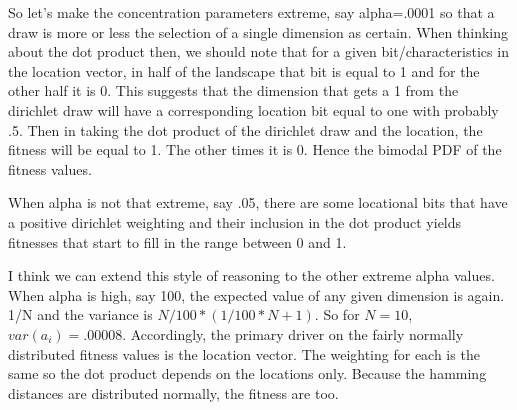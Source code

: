 \documentclass[12pt]{article}
\begin{document}
So let's make the concentration parameters extreme, say alpha=.0001 so that a draw is more or less the selection of a single dimension as certain. When thinking about the dot product then, we should note that for a given bit/characteristics in the location vector, in half of the landscape that bit is equal to 1 and for the other half it is 0. This suggests that the dimension that gets a 1 from the dirichlet draw will have a corresponding location bit equal to one with probably .5. Then in taking the dot product of the dirichlet draw and the location, the fitness will be equal to 1. The other times it is 0. Hence the bimodal PDF of the fitness values.

When alpha is not that extreme, say .05, there are some locational bits that have a positive dirichlet weighting and their inclusion in the dot product yields fitnesses that start to fill in the range between 0 and 1.

I think we can extend this style of reasoning to the other extreme alpha values. When alpha is high, say 100, the expected value of any given dimension is again. 1/N and the variance is $N/100*(1/100*N+1)$. So for $N=10$, $var(a_i) = .00008$. Accordingly, the primary driver on the fairly normally distributed fitness values is the location vector. The weighting for each is the same so the dot product depends on the locations only. Because the hamming distances are distributed normally, the fitness are too.
\end{document}
